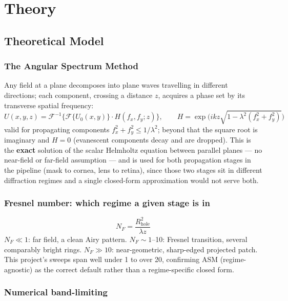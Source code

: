 \documentclass[11pt]{report}
\begin{document}
\part{Theory}

\chapter{Theoretical Model}

\section{The Angular Spectrum Method}

Any field at a plane decomposes into plane waves travelling in different directions; each
component, crossing a distance $z$, acquires a phase set by its transverse spatial
frequency:
\begin{equation}
U(x,y,z) = \mathcal{F}^{-1}\Big\{\mathcal{F}\{U_0(x,y)\}\cdot H(f_x,f_y;z)\Big\},
\qquad H = \exp\!\Big(ikz\sqrt{1-\lambda^2(f_x^2+f_y^2)}\Big)
\end{equation}
valid for propagating components $f_x^2+f_y^2 \le 1/\lambda^2$; beyond that the square root
is imaginary and $H=0$ (evanescent components decay and are dropped). This is the
\textbf{exact} solution of the scalar Helmholtz equation between parallel planes --- no
near-field or far-field assumption --- and is used for both propagation stages in the
pipeline (mask to cornea, lens to retina), since those two stages sit in different
diffraction regimes and a single closed-form approximation would not serve both.

\section{Fresnel number: which regime a given stage is in}
\begin{equation}
N_F = \frac{R_{\text{hole}}^2}{\lambda z}
\end{equation}
$N_F \ll 1$: far field, a clean Airy pattern. $N_F \sim 1$--10: Fresnel transition, several
comparably bright rings. $N_F \gg 10$: near-geometric, sharp-edged projected patch. This
project's sweeps span well under 1 to over 20, confirming ASM (regime-agnostic) as the
correct default rather than a regime-specific closed form.

\section{Numerical band-limiting}
\end{document}
